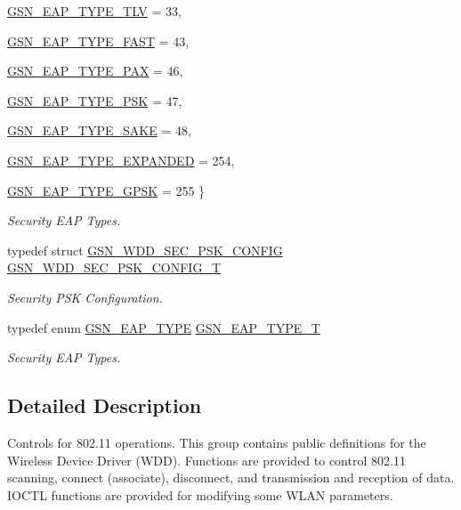 \begin{DoxyCompactItemize}
\hyperlink{a00677_gga95dd88b436cd52a999dda3865de87fe3a391fcb8cd2a4e6472d2de2d093000f0f}{GSN\_\-EAP\_\-TYPE\_\-TLV} =  33, 
\par
\hyperlink{a00677_gga95dd88b436cd52a999dda3865de87fe3a85869e32e8a1a16c23d3618b3ed8e225}{GSN\_\-EAP\_\-TYPE\_\-FAST} =  43, 
\par
\hyperlink{a00677_gga95dd88b436cd52a999dda3865de87fe3a18705e60681f53a9f9550f584565e1c1}{GSN\_\-EAP\_\-TYPE\_\-PAX} =  46, 
\par
\hyperlink{a00677_gga95dd88b436cd52a999dda3865de87fe3af59bb05974539c2b256d125605d7ff05}{GSN\_\-EAP\_\-TYPE\_\-PSK} =  47, 
\par
\hyperlink{a00677_gga95dd88b436cd52a999dda3865de87fe3a19b63475d3d86f29ca46bddd9d67560f}{GSN\_\-EAP\_\-TYPE\_\-SAKE} =  48, 
\par
\hyperlink{a00677_gga95dd88b436cd52a999dda3865de87fe3a16b771a66d69fdda57d88bb29de8e0fc}{GSN\_\-EAP\_\-TYPE\_\-EXPANDED} =  254, 
\par
\hyperlink{a00677_gga95dd88b436cd52a999dda3865de87fe3acc47d3f1a6153d01478076025df045f9}{GSN\_\-EAP\_\-TYPE\_\-GPSK} =  255
 \}
\begin{DoxyCompactList}\small\item\em Security EAP Types. \end{DoxyCompactList}\item 
typedef struct \hyperlink{a00294}{GSN\_\-WDD\_\-SEC\_\-PSK\_\-CONFIG} \hyperlink{a00677_ga08bfb38518da7f8041c06cb1a661f471}{GSN\_\-WDD\_\-SEC\_\-PSK\_\-CONFIG\_\-T}
\begin{DoxyCompactList}\small\item\em Security PSK Configuration. \end{DoxyCompactList}\item 
typedef enum \hyperlink{a00677_ga95dd88b436cd52a999dda3865de87fe3}{GSN\_\-EAP\_\-TYPE} \hyperlink{a00677_ga89d1dbb13f1366a19aef9782b2190e36}{GSN\_\-EAP\_\-TYPE\_\-T}
\begin{DoxyCompactList}\small\item\em Security EAP Types. \end{DoxyCompactList}\end{DoxyCompactItemize}


\subsection{Detailed Description}
Controls for 802.11 operations. This group contains public definitions for the Wireless Device Driver (WDD). Functions are provided to control 802.11 scanning, connect (associate), disconnect, and transmission and reception of data. IOCTL functions are provided for modifying some WLAN parameters. 

